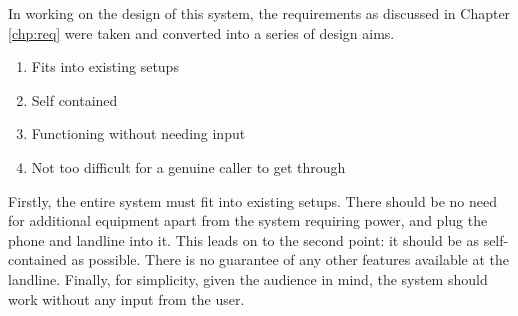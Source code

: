 \documentclass[main.tex]{subfiles}
\begin{document}
In working on the design of this system, the requirements as discussed in Chapter \ref{chp:req} were taken and converted into a series of design aims.

\begin{enumerate}
	\item Fits into existing setups
	\item Self contained
	\item Functioning without needing input
	\item Not too difficult for a genuine caller to get through
\end{enumerate}

Firstly, the entire system must fit into existing setups. There should be no need for additional equipment apart from the system requiring power, and plug the phone and landline into it. This leads on to the second point: it should be as self-contained as possible. There is no guarantee of any other features available at the landline. Finally, for simplicity, given the audience in mind, the system should work without any input from the user.
\end{document}
